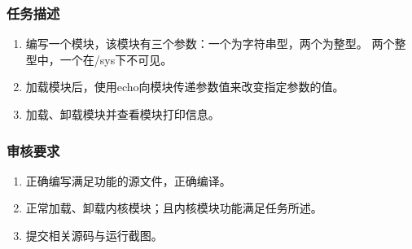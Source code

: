 \documentclass{article}
\begin{document}
\subsubsection{任务描述}
\begin{enumerate}
	\item 编写一个模块，该模块有三个参数：一个为字符串型，两个为整型。
	      两个整型中，一个在/sys下不可见。
	\item 加载模块后，使用echo向模块传递参数值来改变指定参数的值。
	\item 加载、卸载模块并查看模块打印信息。

\end{enumerate}

\subsubsection{审核要求}
\begin{enumerate}
	\item 正确编写满足功能的源文件，正确编译。
	\item 正常加载、卸载内核模块；且内核模块功能满足任务所述。
	\item 提交相关源码与运行截图。
\end{enumerate}
\end{document}
